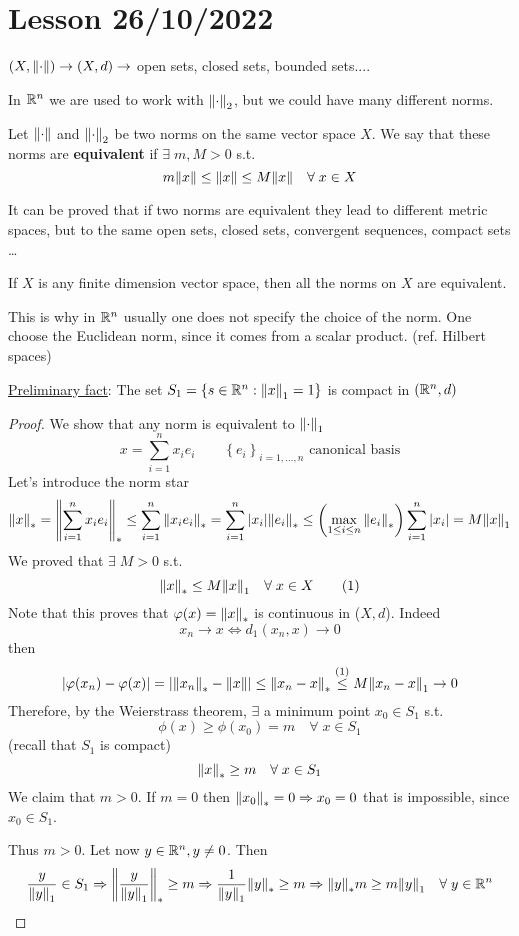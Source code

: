\section{Lesson 26/10/2022}
\((X, \norm{\cdot}) \to (X, d) \to \) open sets, closed sets, bounded sets....

In \(\mathbb{R}^n\) we are used to work with \(\norm{\cdot}_2\), but we could have many different norms.
\begin{definition}
    Let \(\norm{\cdot}\) and \(\norm{\cdot}_2\) be two norms on the same vector space \(X\). We say that these norms are \textbf{equivalent} if \(\exists \; m, M >0\) s.t. 
    \[
        m\norm{x} \leq \norm{x} \leq M\norm{x} \quad \forall\; x \in X
    \]
\end{definition}
It can be proved that if two norms are equivalent they lead to different metric spaces, but to the same open sets, closed sets, convergent sequences, compact sets \dots
\begin{theorem}
    If \(X\) is any finite dimension vector space, then all the norms on \(X\) are equivalent.
\end{theorem}
\begin{remark}
    This is why in \(\mathbb{R}^n\) usually one does not specify the choice of the norm. One choose the Euclidean norm, since it comes from a scalar product. (ref. Hilbert spaces)
\end{remark}
\underline{Preliminary fact}: The set \(S_1 = \left\{ s \in \mathbb{R}^n : \norm{x}_1  = 1\right\}\) is compact in \((\mathbb{R}^n, d)\)
\begin{proof}
    We show that any norm is equivalent to \(\norm{\cdot}_1\)
    \[
        x = \sum_{i=1}^n x_i e_i \qquad \left\{ e_i \right\}_{i= 1,\ldots, n} \mbox{ canonical basis}
    \]
    Let's introduce the norm star 
    \[
        \norm{x}_* = \norm{\sum_{i=1}^n x_i e_i}_* 
        \leq \sum_{i=1}^n \norm{x_i e_i}_* = \sum_{i=1}^n \abs{x_i} \norm{e_i}_* 
        \leq \left(\max_{1 \leq i \leq n} \norm{e_i}_*\right) \sum_{i=1}^n \abs{x_i}
        = M \norm{x}_1
    \]
    We proved that \(\exists \; M> 0\) s.t.
    \[
        \norm{x}_* \leq M \norm{x}_1 \quad \forall \; x \in X \tag{1}
    \]
    Note that this proves that \(\varphi(x) = \norm{x}_*\) is continuous in (\(X, d\)). Indeed 
    \[
        x_n \to x \Leftrightarrow d_1(x_n, x) \to 0
    \]
    then 
    \[
        \abs{\varphi(x_n) - \varphi(x)} = \abs{\norm{x_n}_* -\norm{x}} \leq \norm{x_n - x}_* 
        \overset{(1)}{\leq} M\norm{x_n - x}_1 \to 0
    \]
    Therefore, by the Weierstrass theorem, \(\exists\) a minimum point \(x_0 \in S_1\) s.t. 
    \[
        \phi(x) \geq \phi(x_0) = m \quad \forall\; x \in S_1
    \]
    (recall that \(S_1\) is compact)
    \[
        \norm{x}_* \geq m \quad \forall \; x \in S_1
    \]
    We claim that \(m>0\). If \(m=0\) then \(\norm{x_0}_* = 0 \Rightarrow x_0  = 0\) that is impossible, since \(x_0 \in S_1\).

    Thus \(m>0\). Let now \(y \in \mathbb{R}^n, y \neq 0\). Then 
    \[
        \frac{y}{\norm{y}_1} \in S_1 
        \Rightarrow \norm{\frac{y}{\norm{y}_1}}_* \geq m 
        \Rightarrow \frac{1}{\norm{y}_1} \norm{y}_* \geq m 
        \Rightarrow \norm{y}_*m\geq m \norm{y}_1 \quad \forall \; y \in \mathbb{R}^n 
    \]
\end{proof}
